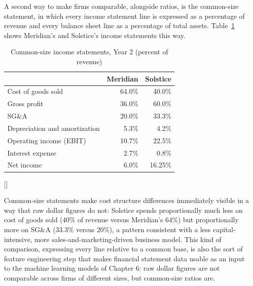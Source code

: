 \documentclass[../ai_in_finance]{subfiles}
\begin{document}
A second way to make firms comparable, alongside ratios, is the common-size statement, in which every income statement line is expressed as a percentage of revenue and every balance sheet line as a percentage of total assets. Table~\ref{tab:common_size} shows Meridian's and Solstice's income statements this way.

\begin{table}[htbp]
\centering
\begin{lrbox}{\bookmeasuredbox}
\begin{tabular}{lrr}
\toprule
 & Meridian & Solstice \\
\midrule
Cost of goods sold & 64.0\% & 40.0\% \\
Gross profit & 36.0\% & 60.0\% \\
SG\&A & 20.0\% & 33.3\% \\
Depreciation and amortization & 5.3\% & 4.2\% \\
Operating income (EBIT) & 10.7\% & 22.5\% \\
Interest expense & 2.7\% & 0.8\% \\
Net income & 6.0\% & 16.25\% \\
\bottomrule
\end{tabular}
\end{lrbox}
\ifdim\wd\bookmeasuredbox<0.65\linewidth
\setlength{\bookcapwidth}{0.65\linewidth}
\else
\setlength{\bookcapwidth}{\wd\bookmeasuredbox}
\fi
{}[\bookcapwidth]{
\usebox{\bookmeasuredbox}
}{
\caption{Common-size income statements, Year 2 (percent of revenue)}
\label{tab:common_size}
}
\end{table}

Common-size statements make cost structure differences immediately visible in a way that raw dollar figures do not: Solstice spends proportionally much less on cost of goods sold (40\% of revenue versus Meridian's 64\%) but proportionally more on SG\&A (33.3\% versus 20\%), a pattern consistent with a less capital-intensive, more sales-and-marketing-driven business model. This kind of comparison, expressing every line relative to a common base, is also the sort of feature engineering step that makes financial statement data usable as an input to the machine learning models of Chapter 6: raw dollar figures are not comparable across firms of different sizes, but common-size ratios are.
\end{document}
